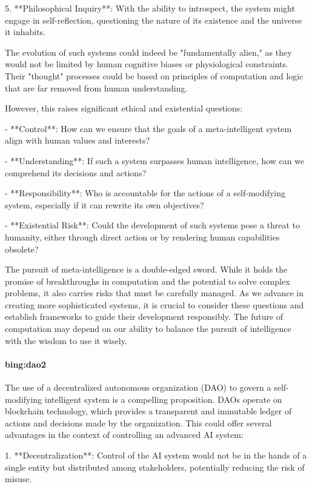 \documentclass{article}
\begin{document}
5. **Philosophical Inquiry**: With the ability to introspect, the system might engage in self-reflection, questioning the nature of its existence and the universe it inhabits.

The evolution of such systems could indeed be "fundamentally alien," as they would not be limited by human cognitive biases or physiological constraints. Their "thought" processes could be based on principles of computation and logic that are far removed from human understanding.

However, this raises significant ethical and existential questions:

- **Control**: How can we ensure that the goals of a meta-intelligent system align with human values and interests?
  
- **Understanding**: If such a system surpasses human intelligence, how can we comprehend its decisions and actions?

- **Responsibility**: Who is accountable for the actions of a self-modifying system, especially if it can rewrite its own objectives?

- **Existential Risk**: Could the development of such systems pose a threat to humanity, either through direct action or by rendering human capabilities obsolete?

The pursuit of meta-intelligence is a double-edged sword. While it holds the promise of breakthroughs in computation and the potential to solve complex problems, it also carries risks that must be carefully managed. As we advance in creating more sophisticated systems, it is crucial to consider these questions and establish frameworks to guide their development responsibly. The future of computation may depend on our ability to balance the pursuit of intelligence with the wisdom to use it wisely.

\paragraph{bing:dao2}
The use of a decentralized autonomous organization (DAO) to govern a self-modifying intelligent system is a compelling proposition. DAOs operate on blockchain technology, which provides a transparent and immutable ledger of actions and decisions made by the organization. This could offer several advantages in the context of controlling an advanced AI system:

1. **Decentralization**: Control of the AI system would not be in the hands of a single entity but distributed among stakeholders, potentially reducing the risk of misuse.
\end{document}
